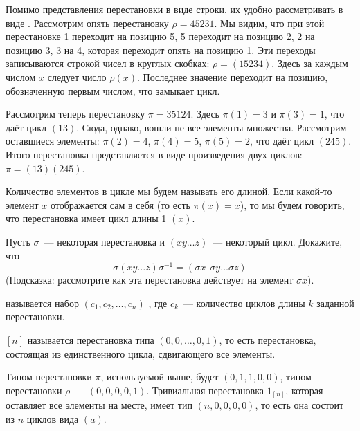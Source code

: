 Помимо представления перестановки в виде строки, их удобно рассматривать в виде . Рассмотрим опять перестановку $\rho = 45231$. Мы видим, что при этой перестановке 1 переходит на позицию 5, 5 переходит на позицию 2, 2 на позицию 3, 3 на 4, которая переходит опять на позицию 1. Эти переходы записываются строкой чисел в круглых скобках: $\rho = (15234)$. Здесь за каждым числом $x$ следует число $\rho(x)$. Последнее значение переходит на позицию, обозначенную первым числом, что замыкает цикл.

Рассмотрим теперь перестановку $\pi = 35124$. Здесь $\pi(1) = 3$ и $\pi(3) = 1$, что даёт цикл $(13)$. Сюда, однако, вошли не все элементы множества. Рассмотрим оставшиеся элементы: $\pi(2) = 4$, $\pi(4) = 5$, $\pi(5) = 2$, что даёт цикл $(245)$. Итого перестановка представляется в виде произведения двух циклов: $\pi = (13)(245)$.

Количество элементов в цикле мы будем называть его длиной. Если какой-то элемент $x$ отображается сам в себя (то есть $\pi(x) = x$), то мы будем говорить, что перестановка имеет цикл длины 1 $(x)$.

\begin{exercise}
Пусть $\sigma$~--- некоторая перестановка и $(x y \ldots z)$~--- некоторый цикл. Докажите, что
$$\sigma(x y \ldots z)\sigma^{-1} = (\sigma x \:\: \sigma y \ldots \sigma z)$$
(Подсказка: рассмотрите как эта перестановка действует на элемент $\sigma x$).
\end{exercise}

\begin{definition}
 называется набор $(c_1, c_2, \ldots, c_n)$ , где $c_k$~--- количество циклов длины $k$ заданной перестановки.
\end{definition}

\begin{definition}
 $[n]$ называется перестановка типа $(0, 0, \ldots, 0, 1)$, то есть перестановка, состоящая из единственного цикла, сдвигающего все элементы.
\end{definition}

\begin{example}
Типом перестановки $\pi$, используемой выше, будет $(0, 1, 1, 0, 0)$, типом перестановки $\rho$~--- $(0, 0, 0, 0, 1)$. Тривиальная перестановка $1_{[n]}$, которая оставляет все элементы на месте, имеет тип $(n, 0, 0, 0, 0)$, то есть она состоит из $n$ циклов вида $(a)$.
\end{example}

